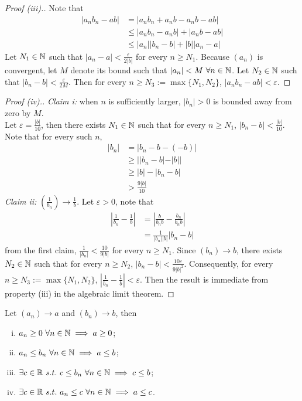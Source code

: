 \documentclass[11pt]{article}
\begin{document}
	\begin{proof}[Proof (iii).]
		Note that
		\begin{align}
			|a_nb_n - ab| &= |a_n b_n + a_nb - a_nb - ab| \\
			&\leq |a_n b_n - a_n b| + |a_n b - ab| \\
			&\leq |a_n| |b_n - b| + |b| |a_n - a|
		\end{align}
		Let $N_1 \in \mathbb{N}$ such that $|a_n - a| < \frac{\varepsilon}{2 |b|}$ for every $n \geq N_1$. Because $(a_n)$ is convergent, let $M$ denote its bound such that $|a_n| < M\ \forall n \in \N$. Let $N_2 \in \mathbb{N}$ such that $|b_n - b| < \frac{\varepsilon}{2 M}$. Then for every $n \geq N_3 := \max\{N_1, N_2\}$, $|a_nb_n - ab| < \varepsilon$.
	\end{proof}
	\begin{proof}[Proof (iv).]
		\emph{Claim i:} when $n$ is sufficiently larger, $|b_n| > 0$ is bounded away from zero by $M$.\\
		Let $\varepsilon = \frac{|b|}{10}$, then there exists $N_1 \in \mathbb{N}$ such that for every $n \geq N_1$, $|b_n - b| < \frac{|b|}{10}$. Note that for every such $n$,
		\begin{align}
			|b_n| &= |b_n - b - (-b)| \\
			&\geq | |b_n - b| - |b| | \\
			&\geq |b| - |b_n - b| \\
			&> \frac{9|b|}{10}
		\end{align}
		\emph{Claim ii:} $\left(\frac{1}{b_n}\right) \to \frac{1}{b}$. Let $\varepsilon > 0$, note that
		\begin{align}
			\left | \frac{1}{b_n} - \frac{1}{b} \right | &= \left | \frac{b}{b_nb} - \frac{b_n}{b_nb} \right | \\
			&= \frac{1}{|b_n||b|} |b_n - b|
		\end{align}
		from the first claim, $\frac{1}{|b_n|} < \frac{10}{9 |b|}$ for every $n \geq N_1$. Since $(b_n) \to b$, there exists $N_2 \in \mathbb{N}$ such that for every $n \geq N_2$, $|b_n - b| < \frac{10 \varepsilon}{9|b|^2}$. Consequently, for every $n \geq N_3 := \max\{N_1, N_2\}$, $\left | \frac{1}{b_n} - \frac{1}{b} \right | < \varepsilon$. Then the result is immediate from property (iii) in the algebraic limit theorem. 
	\end{proof}
	
	\begin{theorem}
		Let $(a_n) \to a$ and $(b_n) \to b$, then
		\begin{enumerate}[(i)]
			\item $a_n \geq 0\ \forall n \in \mathbb{N} \implies a \geq 0$;
			\item $a_n \leq b_n\ \forall n \in \mathbb{N} \implies a \leq b$;
			\item $\exists c \in \R\ s.t.\ c \leq b_n\ \forall n \in \N \implies c \leq b$;
			\item $\exists c \in \R\ s.t.\ a_n \leq c\ \forall n \in \N \implies a \leq c$.
		\end{enumerate}
	\end{theorem}
	
\end{document}
